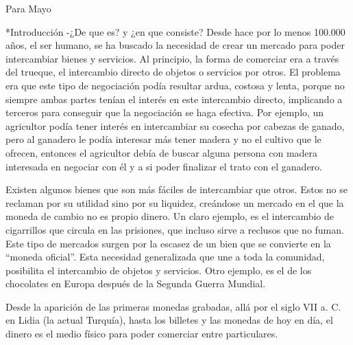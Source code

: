 Para Mayo

*Introducción
-¿De que es? y ¿en que consiste?
Desde hace por lo menos 100.000 años, el ser humano, se ha buscado la necesidad de crear un mercado para poder intercambiar bienes y servicios. Al principio, la forma de comerciar era a través del trueque, el intercambio directo de objetos o servicios por otros. El problema era que este tipo de negociación podía resultar ardua, costosa y lenta, porque no siempre ambas partes tenían el interés en este intercambio directo, implicando a terceros para conseguir que la negociación se haga efectiva. Por ejemplo, un agricultor podía tener interés en intercambiar su cosecha por cabezas de ganado, pero al ganadero le podía interesar más tener madera y no el cultivo que le ofrecen, entonces el agricultor debía de buscar alguna persona con madera interesada en negociar con él y a si poder finalizar el trato con el ganadero.
 
Existen algunos bienes que son más fáciles de intercambiar que otros. Estos no se reclaman por su utilidad sino por su liquidez, creándose un mercado en el que la moneda de cambio no es propio dinero. Un claro ejemplo, es el intercambio de cigarrillos que circula en las prisiones, que incluso sirve a reclusos que no fuman. Este tipo de mercados surgen por la escasez de un bien que se convierte en la ``moneda oficial''. Esta necesidad generalizada que une a toda la comunidad, posibilita el intercambio de objetos y servicios. Otro ejemplo, es el de los chocolates en Europa después de la Segunda Guerra Mundial.

Desde la aparición de las primeras monedas grabadas, allá por el siglo VII a. C. en Lidia (la actual Turquía), hasta los billetes y las monedas de hoy en día, el dinero es el medio físico para poder comerciar entre particulares.

